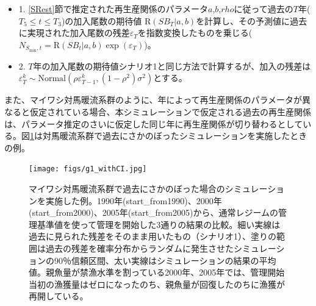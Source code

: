 \documentclass[11pt]{jsarticle}
\begin{document}
\begin{itemize}
\item 1. \ref{SRest}節で推定された再生産関係のパラメータ$a$,$b$,$rho$に従って過去の$T$年($T_5 \leq t \leq T_3$)の加入尾数の期待値 $\mathrm{R}(S\!B_{T}|a,b)$を計算し、その予測値に過去に実現された加入尾数の残差$\varepsilon_{T}$を指数変換したものを乗じる($ N_{S_{\mathrm{min}},t} = \mathrm{R}(S\!B_{t}|a,b) \exp (\varepsilon_T)$)。
\item 2. $T$年の加入尾数の期待値シナリオ1と同じ方法で計算するが、加入の残差は$\varepsilon_{T}^k \sim \mathrm{Normal} (\rho \varepsilon_{T-1}^k,(1-\rho^2) \sigma^2)$とする。
\end{itemize}

また、マイワシ対馬暖流系群のように、年によって再生産関係のパラメータが異なると仮定されている場合、本シミュレーションで仮定される過去の再生産関係は、パラメータ推定のさいに仮定した同じ年に再生産関係が切り替わるとしている。図\ref{fig_whatif}は対馬暖流系群で過去にさかのぼったシミュレーションを実施したときの例。

 \begin{figure}[b]
   \texttt{[image: figs/g1\_withCI.jpg]}
   \caption{
     マイワシ対馬暖流系群で過去にさかのぼった場合のシミュレーションを実施した例。1990年(start\_from1990)、2000年(start\_from2000)、2005年(start\_from2005)から、通常レジームの管理基準値を使って管理を開始した3通りの結果の比較。細い実線は過去に見られた残差をそのまま用いたもの（シナリオ1）、塗りの範囲は過去の残差を確率分布からランダムに発生させたシミュレーションの90％信頼区間、太い実線はシミュレーションの結果の平均値。親魚量が禁漁水準を割っている2000年、2005年では、管理開始当初の漁獲量はゼロになったのち、親魚量が回復したのちに漁獲が再開している。
   }
   \label{fig_whatif}
 \end{figure}

 
\end{document}
